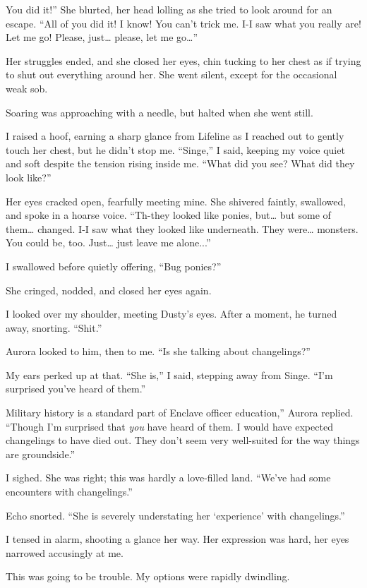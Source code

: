 \leavevmode{}You did it!” She blurted, her head lolling as she tried to look around for an escape. “All of you did it! I know! You can’t trick me. I-I saw what you really are! Let me go! Please, just… please, let me go…”

Her struggles ended, and she closed her eyes, chin tucking to her chest as if trying to shut out everything around her. She went silent, except for the occasional weak sob.

Soaring was approaching with a needle, but halted when she went still.

I raised a hoof, earning a sharp glance from Lifeline as I reached out to gently touch her chest, but he didn’t stop me. “Singe,” I said, keeping my voice quiet and soft despite the tension rising inside me. “What did you see? What did they look like?”

Her eyes cracked open, fearfully meeting mine. She shivered faintly, swallowed, and spoke in a hoarse voice. “Th-they looked like ponies, but… but some of them… changed. I-I saw what they looked like underneath. They were… monsters. You could be, too. Just… just leave me alone...”

I swallowed before quietly offering, “Bug ponies?”

She cringed, nodded, and closed her eyes again.

I looked over my shoulder, meeting Dusty’s eyes. After a moment, he turned away, snorting. “Shit.”

Aurora looked to him, then to me. “Is she talking about changelings?”

My ears perked up at that. “She is,” I said, stepping away from Singe. “I’m surprised you’ve heard of them.”

\leavevmode{}Military history is a standard part of Enclave officer education,” Aurora replied. “Though I’m surprised that \textit{you} have heard of them. I would have expected changelings to have died out. They don’t seem very well-suited for the way things are groundside.”

I sighed. She was right; this was hardly a love-filled land. “We’ve had some encounters with changelings.”

Echo snorted. “She is severely understating her ‘experience’ with changelings.”

I tensed in alarm, shooting a glance her way. Her expression was hard, her eyes narrowed accusingly at me.

This was going to be trouble. My options were rapidly dwindling.

